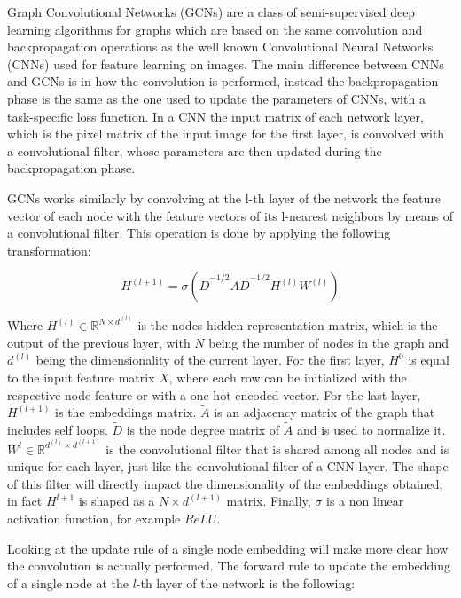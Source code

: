 \documentclass[%
    corpo=13.5pt,
    twoside,
    oldstyle,
    tipotesi=magistrale,
    greek,
    evenboxes
]{toptesi}
\begin{document}
Graph Convolutional Networks (GCNs) \cite{kipf2016} are a class of
semi-supervised deep learning algorithms for graphs which are based on the
same convolution and backpropagation operations as the well known
Convolutional Neural Networks\cite{krizhevsky2012} (CNNs) used for feature
learning on images.
The main difference between CNNs and GCNs is in how the convolution is
performed, instead the backpropagation phase is the same as the one
used to update the parameters of CNNs, with a task-specific loss function.
In a CNN the input matrix of each network layer, which is the pixel matrix
of the input image for the first layer, is convolved with a convolutional
filter, whose parameters are then updated during the backpropagation phase.

GCNs works similarly by convolving at the l-th layer
of the network the feature vector of each node with the feature
vectors of its l-nearest neighbors by means of a convolutional filter.
This operation is done by applying the following transformation:

\begin{equation} \label{gcn1}
H^{(l+1)}=\sigma(\tilde{D}^{-1/2}\tilde{A}\tilde{D}^{-1/2}H^{(l)}W^{(l)})
\end{equation}

Where $H^{(l)} \in\mathbb{R}^{N \times d^{(l)}}$ is the nodes hidden
representation matrix, which is the output of the previous layer, with $N$ being
the number of nodes in the graph and $d^{(l)}$ being the dimensionality of
the current layer. For the first
layer, $H^{0}$ is equal to the input feature matrix $X$, where each row can be
initialized with the respective node feature or with a one-hot encoded vector.
For the last layer, $H^{(l+1)}$ is the embeddings matrix.
$\tilde{A}$ is an adjacency matrix of the graph that includes self loops.
$\tilde{D}$ is the node degree matrix of $\tilde{A}$ and is used to
normalize it.
$W^{l}\in\mathbb{R}^{d^{(l)} \times d^{(l+1)}}$ is the convolutional filter that
is shared among all nodes and is unique for each layer, just like the
convolutional filter of a CNN layer.
The shape of this filter will directly impact the dimensionality of the
embeddings obtained, in fact $H^{l+1}$ is shaped as a $N\times d^{(l+1)}$ matrix.
Finally, $\sigma$ is a non linear activation function, for example $ReLU$.

Looking at the update rule of a single node embedding will make more clear how
the convolution is actually performed.
The forward rule to update the embedding of a single node at the $l$-th layer
of the network is the following:
\end{document}
